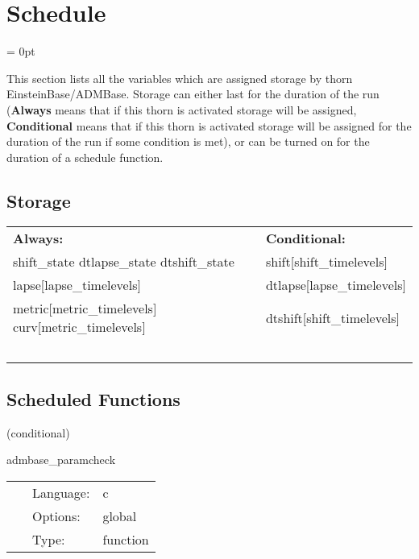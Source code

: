 
\section{Schedule} 


\parskip = 0pt


\noindent This section lists all the variables which are assigned storage by thorn EinsteinBase/ADMBase.  Storage can either last for the duration of the run ({\bf Always} means that if this thorn is activated storage will be assigned, {\bf Conditional} means that if this thorn is activated storage will be assigned for the duration of the run if some condition is met), or can be turned on for the duration of a schedule function.


\subsection*{Storage}

\hspace{5mm}

 \begin{tabular*}{160mm}{ll} 

{\bf Always:}& {\bf Conditional:} \\ 
 shift\_state dtlapse\_state dtshift\_state &  shift[shift\_timelevels]\\ 
 lapse[lapse\_timelevels] &  dtlapse[lapse\_timelevels]\\ 
 metric[metric\_timelevels] curv[metric\_timelevels] &  dtshift[shift\_timelevels]\\ 
~ & ~\\ 
\end{tabular*} 


\subsection*{Scheduled Functions}
\vspace{5mm}

   (conditional) 

\hspace{5mm} admbase\_paramcheck 

\hspace{5mm}{\it check consistency of parameters } 


\hspace{5mm}

 \begin{tabular*}{160mm}{cll} 
~ & Language:  & c \\ 
~ & Options:  & global \\ 
~ & Type:  & function \\ 
\end{tabular*} 


